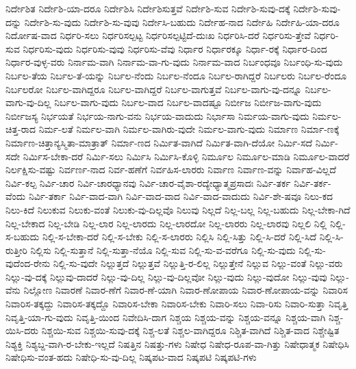 {ನಿರ್ದೇಶಿತ
ನಿರ್ದೇಶಿ-ಯಾ-ದರೂ
ನಿರ್ದೇಶಿಸಿ
ನಿರ್ದೇಶಿಸುತ್ತವೆ
ನಿರ್ದೇಶಿ-ಸುವ
ನಿರ್ದೇಶಿ-ಸುವು-ದಕ್ಕೆ
ನಿರ್ದೇಶಿ-ಸುವು-ದನ್ನು
ನಿರ್ದೇಶಿ-ಸು-ವುದು
ನಿರ್ದೇಶಿ-ಸು-ವುವು
ನಿರ್ದೇಸಿ-ಬಹುದು
ನಿರ್ದೇಹ-ನಾದ
ನಿರ್ದೇಹಿ
ನಿರ್ದೇಹಿ-ಯಾ-ದರೂ
ನಿರ್ದೋಷ-ವಾದ
ನಿರ್ಧರಿ-ಸಲು
ನಿರ್ಧರಿಸಲ್ಪಟ್ಟ
ನಿರ್ಧರಿಸಲ್ಪಟ್ಟಿದೆ-ದುಃಖ
ನಿರ್ಧರಿಸಿ-ದರೆ
ನಿರ್ಧರಿಸು-ತ್ತೇವೆ
ನಿರ್ಧರಿ-ಸುವ
ನಿರ್ಧರಿಸು-ವುದು
ನಿರ್ಧರಿಸು-ವುವು
ನಿರ್ಧರಿಸು-ವೆವು
ನಿರ್ಧಾರ
ನಿರ್ಧಾರಕ್ಕೂ
ನಿರ್ಧಾ-ರಕ್ಕೆ
ನಿರ್ಧಾರ-ದಿಂದ
ನಿರ್ಧಾರ-ವುಳ್ಳ-ವರು
ನಿರ್ನಾಮ-ವಾಗಿ
ನಿರ್ನಾಮ-ವಾ-ಗು-ವುದು
ನಿರ್ನಾಮ-ವಾದ
ನಿರ್ಬಂಧವೂ
ನಿರ್ಬಂಧಿ-ಸು-ವುದು
ನಿರ್ಬಲ-ತೆಯ
ನಿರ್ಬಲ-ತೆ-ಯನ್ನು
ನಿರ್ಬಲ-ನೆಂದು
ನಿರ್ಬಲ-ನೆಂದೂ
ನಿರ್ಬಲ-ರಾಗಿದ್ದರೆ
ನಿರ್ಬಲರು
ನಿರ್ಬಲ-ರೆಂದೂ
ನಿರ್ಬಲರೋ
ನಿರ್ಬಲ-ವಾಗಿದ್ದರೂ
ನಿರ್ಬಲ-ವಾಗಿದ್ದರೆ
ನಿರ್ಬಲ-ವಾಗುತ್ತವೆ
ನಿರ್ಬಲ-ವಾಗು-ವು-ದನ್ನೂ
ನಿರ್ಬಲ-ವಾಗು-ವು-ದಿಲ್ಲ
ನಿರ್ಬಲ-ವಾಗು-ವುದು
ನಿರ್ಬಲ-ವಾದ
ನಿರ್ಬಲ-ವಾದಷ್ಟೂ
ನಿರ್ಬೀಜ
ನಿರ್ಬೀಜ-ವಾಗು-ವುದು
ನಿರ್ಬೀಜಸ್ಯ
ನಿರ್ಭಯತೆ
ನಿರ್ಭಯ-ನಾಗು-ವನು
ನಿರ್ಭಯ-ವಾದುದು
ನಿರ್ಭಾಸಾ
ನಿರ್ಮಯ-ವಾಗು-ವುದು
ನಿರ್ಮಲ-ಚಿತ್ತ-ರಾದ
ನಿರ್ಮ-ಲತೆ
ನಿರ್ಮಲ-ವಾಗಿ
ನಿರ್ಮಲ-ವಾಗಿರು-ವುದೇ
ನಿರ್ಮಲ-ವಾಗು-ವುದು
ನಿರ್ಮಾಣ
ನಿರ್ಮಾ-ಣಕ್ಕೆ
ನಿರ್ಮಾಣ-ಚಿತ್ತಾನ್ಯಸ್ಮಿತಾ-ಮಾತ್ರಾತ್
ನಿರ್ಮಾ-ಣದ
ನಿರ್ಮಿತ-ವಾಗಿದೆ
ನಿರ್ಮಿತ-ವಾಗಿ-ದೆಯೋ
ನಿರ್ಮಿ-ಸದೆ
ನಿರ್ಮಿ-ಸದೇ
ನಿರ್ಮಿಸ-ಬೇಕಾ-ದರೆ
ನಿರ್ಮಿ-ಸಲು
ನಿರ್ಮಿಸಿ
ನಿರ್ಮಿಸಿ-ಕೊಳ್ಳಿ
ನಿರ್ಮೂಲ
ನಿರ್ಮೂಲ-ಮಾಡಿ
ನಿರ್ಮೂಲ-ವಾದರೆ
ನಿರ್ಲಕ್ಷಿಸು-ವಷ್ಟು
ನಿರ್ವರ್ಣ-ನಾದ
ನಿರ್ವ-ಹಣೆಗೆ
ನಿರ್ವಹಿಸ-ಲಾರರು
ನಿರ್ವಾಣ
ನಿರ್ವಾಣ-ವನ್ನು
ನಿರ್ವಾಹ-ವಿಲ್ಲದೆ
ನಿರ್ವಿ-ಕಲ್ಪ
ನಿರ್ವಿ-ಚಾರ
ನಿರ್ವಿ-ಚಾರಧ್ಯಾನವು
ನಿರ್ವಿ-ಚಾರ-ವೈಶಾ-ರದ್ಯೇಧ್ಯಾತ್ಮಪ್ರಸಾದಃ
ನಿರ್ವಿ-ತರ್ಕ
ನಿರ್ವಿ-ತರ್ಕ-ವೆಂದು
ನಿರ್ವಿ-ತರ್ಕಾ
ನಿರ್ವಿ-ವಾದ-ವಾಗಿ
ನಿರ್ವಿ-ವಾದ-ವಾದ
ನಿರ್ವಿ-ವಾದ-ವಾದುದು
ನಿರ್ವಿ-ಶೇ-ಷವೂ
ನಿಲು-ಕದ
ನಿಲು-ಕಿದೆ
ನಿಲುಕುವ
ನಿಲುಕು-ವಂತೆ
ನಿಲುಕು-ವು-ದಿಲ್ಲವೊ
ನಿಲುವು
ನಿಲ್ಲದೆ
ನಿಲ್ಲ-ಬಲ್ಲ
ನಿಲ್ಲ-ಬಹುದು
ನಿಲ್ಲ-ಬೇಕಾ-ಗಿದೆ
ನಿಲ್ಲ-ಬೇಕಾದ
ನಿಲ್ಲ-ಬೇಡಿ
ನಿಲ್ಲ-ಲಾರ
ನಿಲ್ಲ-ಲಾರದು
ನಿಲ್ಲ-ಲಾರದೋ
ನಿಲ್ಲ-ಲಾರರು
ನಿಲ್ಲ-ಲಾರವು
ನಿಲ್ಲಲಿ
ನಿಲ್ಲಿ
ನಿಲ್ಲಿ-ಸ-ಬಹುದು
ನಿಲ್ಲಿ-ಸ-ಬೇಕಾ-ದರೆ
ನಿಲ್ಲಿ-ಸ-ಬೇಕು
ನಿಲ್ಲಿ-ಸ-ಲಾರರು
ನಿಲ್ಲಿಸಿ
ನಿಲ್ಲಿ-ಸಿತ್ತು
ನಿಲ್ಲಿ-ಸಿ-ದರೆ
ನಿಲ್ಲಿ-ಸಿದೆ
ನಿಲ್ಲಿ-ಸಿ-ರುತ್ತೀರಿ
ನಿಲ್ಲಿಸು
ನಿಲ್ಲಿ-ಸುತ್ತಾನೆ
ನಿಲ್ಲಿ-ಸುತ್ತಾ-ನೆಯೊ
ನಿಲ್ಲಿ-ಸುವ
ನಿಲ್ಲಿ-ಸು-ವ-ವರೆಗೂ
ನಿಲ್ಲಿ-ಸು-ವುದು
ನಿಲ್ಲಿ-ಸು-ವುದೆಂದ-ರೇನು
ನಿಲ್ಲಿ-ಸು-ವುದೇ
ನಿಲ್ಲುತ್ತದೆ
ನಿಲ್ಲುತ್ತವೆ
ನಿಲ್ಲುತ್ತಿ-ರ-ಲಿಲ್ಲ
ನಿಲ್ಲುತ್ತೇನೆ
ನಿಲ್ಲುವ
ನಿಲ್ಲು-ವಂತೆ
ನಿಲ್ಲು-ವರು
ನಿಲ್ಲು-ವು-ದಕ್ಕೆ
ನಿಲ್ಲುವು-ದಾದರೆ
ನಿಲ್ಲು-ವು-ದಿಲ್ಲ
ನಿಲ್ಲು-ವು-ದಿಲ್ಲವೋ
ನಿಲ್ಲು-ವುದು
ನಿಲ್ಲು-ವುದೋ
ನಿಲ್ಲು-ವುವು
ನಿಲ್ಲು-ವೆನು
ನಿಲ್ಲೋಣ
ನಿವಾರಣೆ
ನಿವಾರ-ಣೆಗೆ
ನಿವಾರ-ಣೆ-ಯಾಗಿ
ನಿವಾರ-ಣೋಪಾಯ
ನಿವಾರ-ಣೋಪಾಯ-ವನ್ನು
ನಿವಾರಿಸ
ನಿವಾರಿಸ-ತಕ್ಕದ್ದು
ನಿವಾರಿಸ-ತಕ್ಕದ್ದೊ
ನಿವಾರಿಸ-ಬೇಕಾ
ನಿವಾರಿಸ-ಬೇಕು
ನಿವಾರಿ-ಸಲು
ನಿವಾ-ರಿಸು
ನಿವಾರಿ-ಸುತ್ತಾ
ನಿವೃತ್ತಿ
ನಿವೃತ್ತಿ-ಯಾ-ಗು-ವುದು
ನಿವೃತ್ತಿ-ಯಿಂದ
ನಿವೇದಿಸಿ-ದಾಗ
ನಿಶ್ಚಯ
ನಿಶ್ಚಯ-ವನ್ನು
ನಿಶ್ಚಯ-ವನ್ನೂ
ನಿಶ್ಚಯ-ವಾಗಿ
ನಿಶ್ಚ-ಯಿಸಿ-ದರು
ನಿಶ್ಚಯಿ-ಸುವ
ನಿಶ್ಚಯಿ-ಸುವು-ದಕ್ಕೆ
ನಿಶ್ಚ-ಲತೆ
ನಿಶ್ಚಲ-ವಾಗಿದ್ದರೂ
ನಿಶ್ಚಿತ-ವಾಗಿದೆ
ನಿಶ್ಚಿತ-ವಾದ
ನಿಶ್ಚೇಷ್ಟಿತ
ನಿಶ್ಯಕ್ತಿ
ನಿಶ್ಯಬ್ದ-ವಾಗಿ-ರ-ಬೇಕು-ಇಲ್ಲದೆ
ನಿಷತ್ತಿನ
ನಿಷತ್ತು-ಗಳು
ನಿಷೇಧ
ನಿಷೇಧ-ರೂಪ-ವಾ-ಗಿತ್ತು
ನಿಷೇಧಾತ್ಮಕ
ನಿಷೇಧಿಸಿ
ನಿಷೇಧಿಸು-ವಂತ-ಹದು
ನಿಷೇಧಿ-ಸು-ವು-ದಿಲ್ಲ
ನಿಷ್ಕಪಟ-ವಾದ
ನಿಷ್ಕಪಟಿ
ನಿಷ್ಕಪಟಿ-ಗಳು
}
